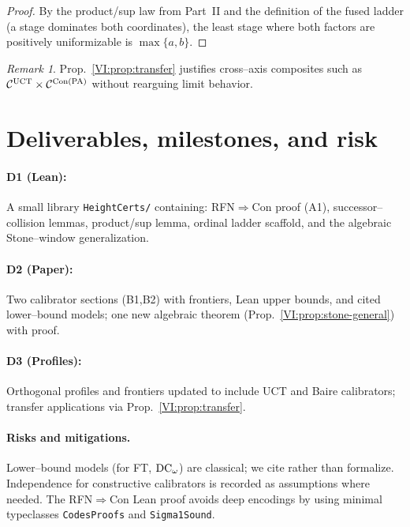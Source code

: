 \documentclass[11pt]{article}
\theoremstyle{definition}
\theoremstyle{remark}
\newtheorem{remark}[theorem]{Remark}
\begin{document}
\begin{proof}
By the product/sup law from Part~II and the definition of the fused ladder (a stage dominates both coordinates), the least stage where both factors are positively uniformizable is \(\max\{a,b\}\).
\end{proof}

\begin{remark}
Prop.~\ref{VI:prop:transfer} justifies cross–axis composites such as \(\mathcal C^{\mathrm{UCT}}\times \mathcal C^{\mathrm{Con}(\mathrm{PA})}\) without rearguing limit behavior.
\end{remark}

\section{Deliverables, milestones, and risk}

\paragraph{D1 (Lean):} A small library \texttt{HeightCerts/} containing:
RFN\(\Rightarrow\)Con proof (A1), successor–collision lemmas, product/sup lemma, ordinal ladder scaffold, and the algebraic Stone–window generalization.

\paragraph{D2 (Paper):} Two calibrator sections (B1,B2) with frontiers, Lean upper bounds, and cited lower–bound models; one new algebraic theorem (Prop.~\ref{VI:prop:stone-general}) with proof.

\paragraph{D3 (Profiles):} Orthogonal profiles and frontiers updated to include UCT and Baire calibrators; transfer applications via Prop.~\ref{VI:prop:transfer}.

\paragraph{Risks and mitigations.}
Lower–bound models (for FT, \(\mathrm{DC}_\omega\)) are classical; we cite rather than formalize. Independence for constructive calibrators is recorded as assumptions where needed. The RFN\(\Rightarrow\)Con Lean proof avoids deep encodings by using minimal typeclasses \texttt{CodesProofs} and \texttt{Sigma1Sound}.
\end{document}
